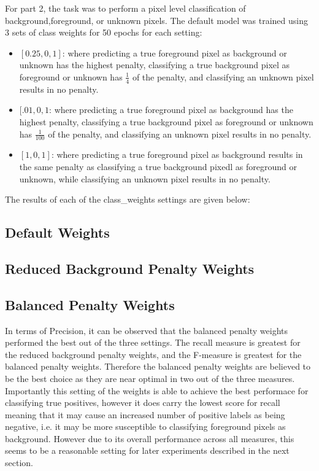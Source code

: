 \documentclass{article}
\begin{document}
For part 2, the task was to perform a pixel level classification of background,foreground, or unknown pixels. The default model was trained using 3 sets of class weights for 50 epochs for each setting:
\begin{itemize}
	\item $[0.25,0,1]$: where predicting a true foreground pixel as background or unknown has the highest penalty, classifying a true background pixel as foreground or unknown has $\frac{1}{4}$ of the penalty, and classifying an unknown pixel results in no penalty.
	\item $[.01,0,1$: where predicting a true foreground pixel as background has the highest penalty, classifying a true background pixel as foreground or unknown has $\frac{1}{100}$ of the penalty, and classifying an unknown pixel results in no penalty. 
	\item $[1,0,1]$: where predicting a true foreground pixel as background results in the same penalty as classifying a true background pixedl as foreground or unknown, while classifying an unknown pixel results in no penalty.
	\end{itemize}

	The results of each of the class\_weights settings are given below:
	\subsection*{Default Weights}
		

	\subsection*{Reduced Background Penalty Weights}
		


	\subsection*{Balanced Penalty Weights}
		

In terms of Precision, it can be observed that the balanced penalty weights performed the best out of the three settings. The recall measure is greatest for the reduced background penalty weights, and the F-measure is greatest for the balanced penalty weights. Therefore the balanced penalty weights are believed to be the best choice as they are near optimal in two out of the three measures. Importantly this setting of the weights is able to achieve the best performace for classifying true positives, however it does carry the lowest score for recall meaning that it may cause an increased number of positive labels as being negative, i.e. it may be more susceptible to classifying foreground pixels as background. However due to its overall performance across all measures, this seems to be a reasonable setting for later experiments described in the next section.
\end{document}
